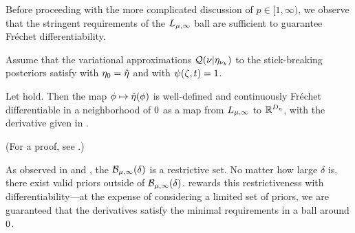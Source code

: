 Before proceeding with the more complicated discussion of $p \in [1, \infty)$,
we observe that the stringent requirements of the ${L_{\mu,\infty}}$ ball
are sufficient to guarantee Fr{\'e}chet differentiability.

\begin{assu}
%
Assume that the variational approximations $\mathcal{Q}(\nu \vert \eta_{\nu_{k}})$ to the
stick-breaking posteriors satisfy  with $\eta_0 =
\hat\eta$ and with $\psi(\zeta, t) = 1$.
%
\end{assu}


\begin{thm}
%
Let  hold. Then the map $\phi \mapsto
\hat\eta(\phi)$ is well-defined and continuously Fr{\'e}chet differentiable in a
neighborhood of $0$ as a map from ${L_{\mu,\infty}}$ to $\mathbb{R}^{D_{\eta}}$,
with the derivative given in .

(For a proof, see  .)

\end{thm}

As observed in  and , the
$\mathcal{B}_{\mu,\infty}(\delta)$ is a restrictive set.  No matter how large
$\delta$ is, there exist valid priors outside of $\mathcal{B}_{\mu,\infty}(\delta)$.
 rewards this restrictiveness with differentiability---at
the expense of considering a limited set of priors, we are guaranteed that
the derivatives satisfy the minimal requirements in a ball around $0$.

